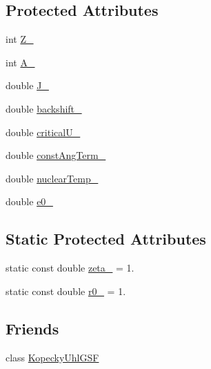 \subsection*{Protected Attributes}
\begin{DoxyCompactItemize}
\item 
int \hyperlink{classLevelDensity_a4e3c2f3637a11130dc5d0504bf0af9c9}{Z\-\_\-}
\item 
int \hyperlink{classLevelDensity_a49a372560d87e4bfda8759eb315a10ed}{A\-\_\-}
\item 
double \hyperlink{classLevelDensity_a20733f689cc018869ef19f2e6bcd3c87}{J\-\_\-}
\item 
double \hyperlink{classLevelDensity_ab38ac8b223b47b3f627b1d1443168b28}{backshift\-\_\-}
\item 
double \hyperlink{classLevelDensity_a580dc958baa563bf774a0a6f6b4fea7e}{critical\-U\-\_\-}
\item 
double \hyperlink{classLevelDensity_acfc91464640c910baac56f85751b7dac}{const\-Ang\-Term\-\_\-}
\item 
double \hyperlink{classLevelDensity_a7a97d015ef2f00caa58af1854ee492ca}{nuclear\-Temp\-\_\-}
\item 
double \hyperlink{classLevelDensity_a61c66e8f640cbffe7d2977d69981e30c}{e0\-\_\-}
\end{DoxyCompactItemize}
\subsection*{Static Protected Attributes}
\begin{DoxyCompactItemize}
\item 
static const double \hyperlink{classLevelDensity_a0b95afe91b297932f43c75cbcedf3ff9}{zeta\-\_\-} = 1.
\item 
static const double \hyperlink{classLevelDensity_afbfc27a16a0ef3a990dce6ef5acf7863}{r0\-\_\-} = 1.
\end{DoxyCompactItemize}
\subsection*{Friends}
\begin{DoxyCompactItemize}
\item 
class \hyperlink{classLevelDensity_a82f9f4a3eb74ca7e08cb54054e30cd76}{Kopecky\-Uhl\-G\-S\-F}
\end{DoxyCompactItemize}


